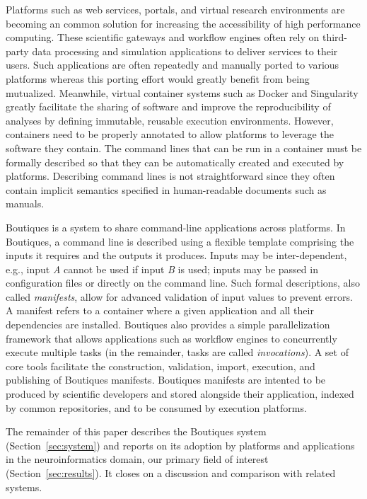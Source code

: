 \documentclass{article}
\newcommand{\boutiques}{Boutiques\xspace}
\begin{document}
Platforms such as web services, portals, and virtual research
environments are becoming an common solution for increasing the
accessibility of high performance computing. These scientific gateways and
workflow engines often rely on third-party data processing and simulation
applications to deliver services to their users. Such applications are
often repeatedly and manually ported to various platforms whereas this
porting effort would greatly benefit from being mutualized. Meanwhile,
virtual container systems such as Docker and Singularity greatly facilitate
the sharing of software and improve the reproducibility of analyses by defining
immutable, reusable execution environments. However, containers need
to be properly annotated to allow platforms to leverage the software
they contain. The command lines that can be run in a container must be formally
described so that they can be automatically created and executed by platforms.
Describing command lines is not straightforward since they often contain
implicit semantics specified in human-readable documents such as manuals.

\boutiques is a system to share command-line applications across
platforms. In \boutiques, a command line is described using a flexible
template comprising the inputs it requires and the outputs it
produces. Inputs may be inter-dependent, e.g., input \emph{A} cannot be used
if input \emph{B} is used; inputs may be passed in configuration files
or directly on the command line. Such formal descriptions, also called
\emph{manifests}, allow for advanced validation of input values to
prevent errors. A manifest refers to a container where a given application
and all their dependencies are installed. \boutiques also provides a
simple parallelization framework that allows applications such as
workflow engines to concurrently execute multiple tasks (in the
remainder, tasks are called \emph{invocations}). A set of core tools
facilitate the construction, validation, import, execution, and publishing
of \boutiques manifests. \boutiques manifests are intented to be produced by
scientific developers and stored alongside their application, indexed by common
repositories, and to be consumed by execution platforms.

The remainder of this paper describes the \boutiques system
(Section~\ref{sec:system}) and reports on its adoption by platforms
and applications in the neuroinformatics domain, our primary field of
interest (Section~\ref{sec:results}). It closes on a discussion and
comparison with related systems.
\end{document}
